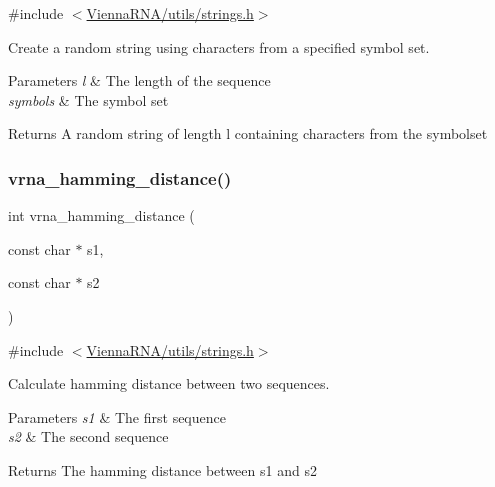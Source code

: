 {\ttfamily \#include $<$\hyperlink{strings_8h}{Vienna\+R\+N\+A/utils/strings.\+h}$>$}



Create a random string using characters from a specified symbol set. 


\begin{DoxyParams}{Parameters}
{\em l} & The length of the sequence \\
\hline
{\em symbols} & The symbol set \\
\hline
\end{DoxyParams}
\begin{DoxyReturn}{Returns}
A random string of length \textquotesingle{}l\textquotesingle{} containing characters from the symbolset 
\end{DoxyReturn}
\mbox{\label{group__string__utils_ga301798b43b6f66687985c725efd14f32}} 
\subsubsection{\texorpdfstring{vrna\+\_\+hamming\+\_\+distance()}{vrna\_hamming\_distance()}}
{\footnotesize\ttfamily int vrna\+\_\+hamming\+\_\+distance (\begin{DoxyParamCaption}\item[{const char $\ast$}]{s1,  }\item[{const char $\ast$}]{s2 }\end{DoxyParamCaption})}



{\ttfamily \#include $<$\hyperlink{strings_8h}{Vienna\+R\+N\+A/utils/strings.\+h}$>$}



Calculate hamming distance between two sequences. 


\begin{DoxyParams}{Parameters}
{\em s1} & The first sequence \\
\hline
{\em s2} & The second sequence \\
\hline
\end{DoxyParams}
\begin{DoxyReturn}{Returns}
The hamming distance between s1 and s2 
\end{DoxyReturn}
\mbox{\label{group__string__utils_ga5d1c2271e79d9bcb52d4e68360763fb9}} 
